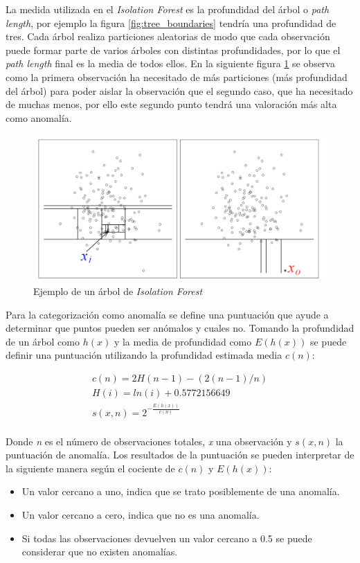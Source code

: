 La medida utilizada en el \textit{Isolation Forest} es la profundidad del árbol o \textit{path length}, por ejemplo la figura \ref{fig:tree_boundaries} tendría una profundidad de tres. Cada árbol realiza particiones aleatorias de modo que cada observación puede formar parte de varios árboles con distintas profundidades, por lo que el \textit{path length} final es la media de todos ellos. En la siguiente figura \ref{fig:isolation_forest} se observa como la primera observación ha necesitado de más particiones (más profundidad del árbol) para poder aislar la observación que el segundo caso, que ha necesitado de muchas menos, por ello este segundo punto tendrá una valoración más alta como anomalía.

\begin{figure}[h]
    \centering
    \includegraphics[width=12cm]{figs/isolation.png}
    \caption{Ejemplo de un árbol de \textit{Isolation Forest}}
    \label{fig:isolation_forest}
\end{figure}

Para la categorización como anomalía se define una puntuación que ayude a determinar que puntos pueden ser anómalos y cuales no. Tomando la profundidad de un árbol como \( h(x)\) y la media de profundidad como \( E(h(x))\) se puede definir una puntuación utilizando la profundidad estimada media \( c(n)\):

\begin{gather*}
c(n) = 2H(n-1) - (2(n-1)/n) \\
H(i) = ln(i) + 0.5772156649 \\
s(x,n) = 2^{-\frac{E(h(x))}{c(n)}} \\
\end{gather*}

Donde \textit{n} es el número de observaciones totales, \textit{x} una observación y \(s(x,n)\) la puntuación de anomalía. Los resultados de la puntuación se pueden interpretar de la siguiente manera según el cociente de \( c(n)\) y \( E(h(x))\):
\begin{itemize}
    \item Un valor cercano a uno, indica que se trato posiblemente de una anomalía.
    \item Un valor cercano a cero, indica que no es una anomalía.
    \item Si todas las observaciones devuelven un valor cercano a 0.5 se puede considerar que no existen anomalías.
\end{itemize}

